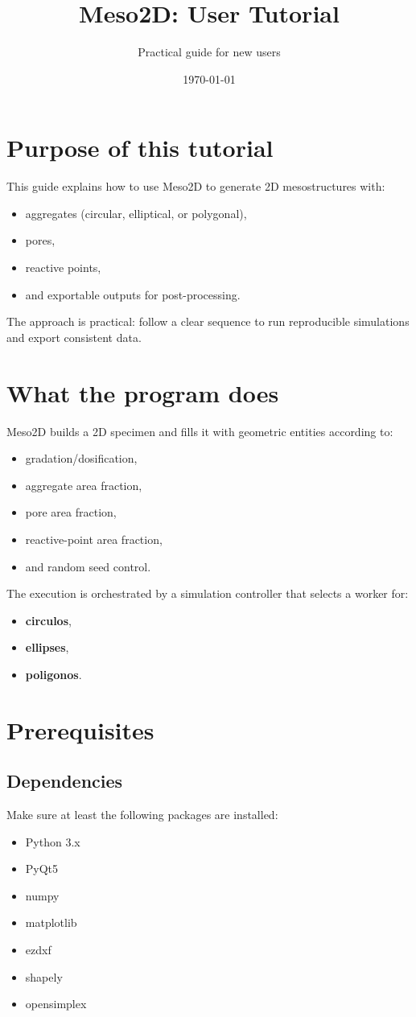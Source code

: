 \documentclass[11pt,a4paper]{article}
\title{Meso2D: User Tutorial}
\author{Practical guide for new users}
\date{\today}
\begin{document}
\maketitle
\tableofcontents
\newpage

\section{Purpose of this tutorial}
This guide explains how to use Meso2D to generate 2D mesostructures with:
\begin{itemize}[leftmargin=1.5em]
  \item aggregates (circular, elliptical, or polygonal),
  \item pores,
  \item reactive points,
  \item and exportable outputs for post-processing.
\end{itemize}

The approach is practical: follow a clear sequence to run reproducible simulations and export consistent data.

\section{What the program does}
Meso2D builds a 2D specimen and fills it with geometric entities according to:
\begin{itemize}[leftmargin=1.5em]
  \item gradation/dosification,
  \item aggregate area fraction,
  \item pore area fraction,
  \item reactive-point area fraction,
  \item and random seed control.
\end{itemize}

The execution is orchestrated by a simulation controller that selects a worker for:
\begin{itemize}[leftmargin=1.5em]
  \item \textbf{circulos},
  \item \textbf{ellipses},
  \item \textbf{poligonos}.
\end{itemize}

\section{Prerequisites}
\subsection{Dependencies}
Make sure at least the following packages are installed:
\begin{itemize}[leftmargin=1.5em]
  \item Python 3.x
  \item PyQt5
  \item numpy
  \item matplotlib
  \item ezdxf
  \item shapely
  \item opensimplex
\end{itemize}
\end{document}
